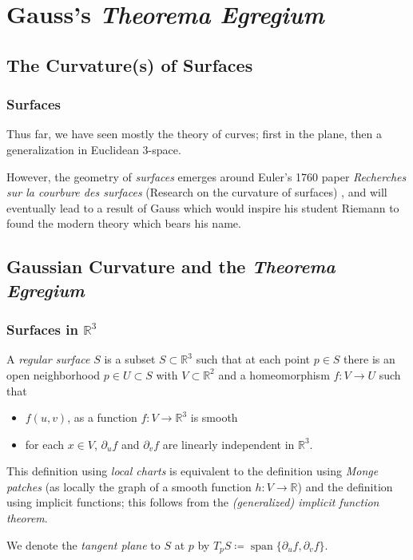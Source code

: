 \documentclass[handout]{beamer}
\DeclareMathOperator{\Span}{span}
\newcommand{\R}{\mathbb{R}}
\theoremstyle{definition}
\begin{document}
\section{Gauss's \emph{Theorema Egregium}}

\subsection{The Curvature(s) of Surfaces}

\begin{frame}
    \frametitle{Surfaces}

    \pause
    Thus far, we have seen mostly the theory of curves; first in the plane,
    then a generalization in Euclidean 3-space.

    \pause
    However, the geometry of \emph{surfaces} emerges around Euler's 1760
    paper \textit{Recherches sur la courbure des surfaces} (Research on
    the curvature of surfaces) \cite{geom-diff-view,euler}, and will eventually
    lead to a result of Gauss which would inspire his student Riemann to
    found the modern theory which bears his name.

\end{frame}

\subsection{Gaussian Curvature and the \emph{Theorema Egregium}}

\begin{frame}
    \frametitle{Surfaces in $\R^3$}

    \pause
    \begin{definition}
        A \emph{regular surface} $S$ is a subset $S \subset \R^3$ such that at each point
        $p \in S$ there is an open neighborhood $p \in U \subset S$ with $V \subset \R^2$
        and a homeomorphism $f : V \to U$ such that
        \begin{itemize}
            \item $f(u,v)$, as a function $f : V \to \R^3$ is smooth
            \item for each $x \in V$, $\partial_u f$ and $\partial_v f$ are
            linearly independent in $\R^3$.
        \end{itemize}
    \end{definition}

    \pause
    This definition using \emph{local charts} is equivalent
    to the definition using \emph{Monge patches} (as locally the graph
    of a smooth function $h : V \to \R$) and the definition using implicit functions;
    this follows from the \emph{(generalized) implicit function theorem}.

    \pause
    We denote the \emph{tangent plane} to $S$ at $p$ by
    \(
        T_pS \coloneqq \Span\{\partial_uf,\partial_vf\}.
    \)
\end{frame}
\end{document}
